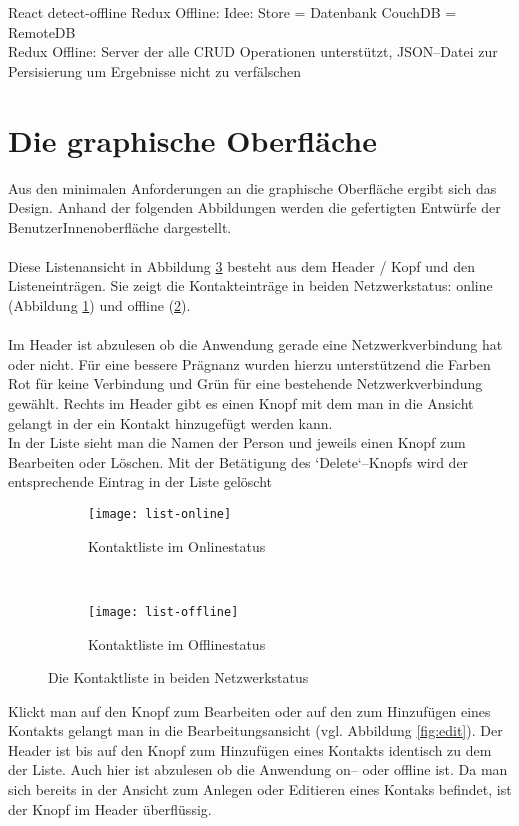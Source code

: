 React detect-offline
Redux Offline: Idee: Store = Datenbank
CouchDB = RemoteDB\\
Redux Offline: Server der alle \gls{CRUD} Operationen unterstützt,
\gls{JSON}--Datei zur Persisierung um Ergebnisse nicht zu verfälschen 

\section{Die graphische Oberfläche}
Aus den minimalen Anforderungen an die graphische Oberfläche ergibt sich das Design. Anhand der folgenden Abbildungen werden die gefertigten Entwürfe der BenutzerInnenoberfläche dargestellt.\\\\
Diese Listenansicht in Abbildung \ref{fig:list} besteht aus dem Header / Kopf und den Listeneinträgen. Sie zeigt die Kontakteinträge in beiden Netzwerkstatus: online (Abbildung \ref{fig:list-online}) und offline (\ref{fig:list-offline}).\\\\
Im Header ist abzulesen ob die Anwendung gerade eine Netzwerkverbindung hat oder nicht. Für eine bessere Prägnanz wurden hierzu unterstützend die Farben Rot für keine Verbindung und Grün für eine bestehende Netzwerkverbindung gewählt. Rechts im Header gibt es einen Knopf mit dem man in die Ansicht gelangt in der ein Kontakt hinzugefügt werden kann.\\
In der Liste sieht man die Namen der Person und jeweils einen Knopf zum Bearbeiten oder Löschen. Mit der Betätigung des `Delete`--Knopfs wird der entsprechende Eintrag in der Liste gelöscht
\begin{figure}[H]
  \centering
  \begin{subfigure}[t]{0.49\textwidth}
          \texttt{[image: list-online]}
          \caption{Kontaktliste im Onlinestatus}
          \label{fig:list-online}
  \end{subfigure}
  ~ 
  \begin{subfigure}[t]{0.49\textwidth}
          \texttt{[image: list-offline]}
          \caption{Kontaktliste im Offlinestatus}
          \label{fig:list-offline}
  \end{subfigure}
  \grayRule
  \caption{Die Kontaktliste in beiden Netzwerkstatus}
  \label{fig:list}
\end{figure}
Klickt man auf den Knopf zum Bearbeiten oder auf den zum Hinzufügen eines Kontakts gelangt man in die Bearbeitungsansicht (vgl. Abbildung \ref{fig:edit}). Der Header ist bis auf den Knopf zum Hinzufügen eines Kontakts identisch zu dem der Liste. Auch hier ist abzulesen ob die Anwendung on-- oder offline ist. Da man sich bereits in der Ansicht zum Anlegen oder Editieren eines Kontaks befindet, ist der Knopf im Header überflüssig.\\
